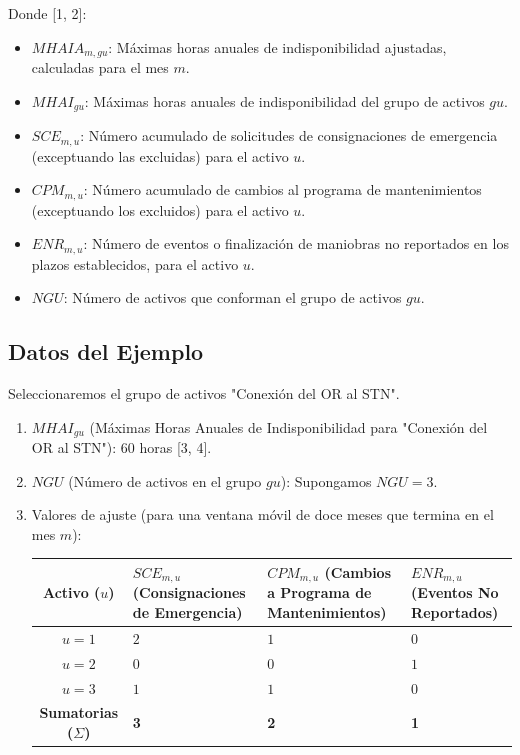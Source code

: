\documentclass[a5paper]{book}%
\begin{document}
Donde [1, 2]:
\begin{itemize}
	\item $MHAI A_{m, gu}$: Máximas horas anuales de indisponibilidad ajustadas, calculadas para el mes $m$.
	\item $MHAI_{gu}$: Máximas horas anuales de indisponibilidad del grupo de activos $gu$.
	\item $SCE_{m, u}$: Número acumulado de solicitudes de consignaciones de emergencia (exceptuando las excluidas) para el activo $u$.
	\item $CPM_{m, u}$: Número acumulado de cambios al programa de mantenimientos (exceptuando los excluidos) para el activo $u$.
	\item $ENR_{m, u}$: Número de eventos o finalización de maniobras no reportados en los plazos establecidos, para el activo $u$.
	\item $NGU$: Número de activos que conforman el grupo de activos $gu$.
\end{itemize}

\subsection*{Datos del Ejemplo}

Seleccionaremos el grupo de activos "Conexión del OR al STN".

\begin{enumerate}
	\item $MHAI_{gu}$ (Máximas Horas Anuales de Indisponibilidad para "Conexión del OR al STN"): $60$ horas [3, 4].
	\item $NGU$ (Número de activos en el grupo $gu$): Supongamos $NGU = 3$.
	\item Valores de ajuste (para una ventana móvil de doce meses que termina en el mes $m$):
	
	\begin{center}
		\begin{tabular}{|c|p{2cm}|p{2cm}|p{2cm}|}
			\hline
			Activo ($u$) & $SCE_{m, u}$ (Consignaciones de Emergencia) & $CPM_{m, u}$ (Cambios a Programa de Mantenimientos) & $ENR_{m, u}$ (Eventos No Reportados) \\
			\hline
			$u=1$ & $2$ & $1$ & $0$ \\
			$u=2$ & $0$ & $0$ & $1$ \\
			$u=3$ & $1$ & $1$ & $0$ \\
			\hline
			\textbf{Sumatorias ($\Sigma$)} & \textbf{3} & \textbf{2} & \textbf{1} \\
			\hline
		\end{tabular}
	\end{center}
\end{enumerate}
\end{document}
